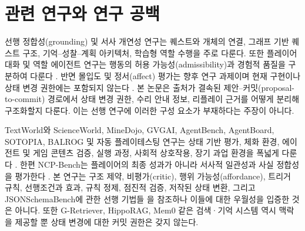 \documentclass[journal]{IEEEtran}
\begin{document}
\section{관련 연구와 연구 공백}
선행 정합성(grounding) 및 서사 개연성 연구는 퀘스트와 개체의 연결, 그래프 기반 퀘스트 구조, 기억--성찰--계획 아키텍처, 학습형 역할 수행을 주로 다룬다. 또한 플레이어 대화 및 역할 에이전트 연구는 행동의 허용 가능성(admissibility)과 경험적 품질을 구분하여 다룬다 \cite{S03_weir2024ontologically,S20_ashby2023personalized,S07_park2023generative,S08_shao2023character,S21_akoury2023player,S22_hochreiter2026beyond,S23_yin2026contextualized,S02_figueiredo2025scaffolded}. 반면 몰입도 및 정서(affect) 평가는 향후 연구 과제이며 현재 구현이나 상태 변경 권한에는 포함되지 않는다 \cite{S24_yannakakis2011experiencedriven,S25_melhart2020engagement,S26_wang2026engagement}. 본 논문은 출처가 결속된 제안--커밋(proposal-to-commit) 경로에서 상태 변경 권한, 수리 안내 정보, 리플레이 근거를 어떻게 분리해 구조화할지 다룬다. 이는 선행 연구에 이러한 구성 요소가 부재하다는 주장이 아니다.

TextWorld와 ScienceWorld, MineDojo, GVGAI, AgentBench, AgentBoard, SOTOPIA, BALROG 및 자동 플레이테스팅 연구는 상태 기반 평가, 체화 환경, 에이전트 및 게임 콘텐츠 검증, 실행 과정, 사회적 상호작용, 장기 과업 환경을 폭넓게 다룬다 \cite{S11_cote2019textworld,S12_wang2022scienceworld,S13_fan2022minedojo,S14_perezliebana2019gvgai,S15_liu2024agentbench,S16_ma2024agentboard,S17_zhou2024sotopia,S18_paglieri2025balrog,S19_lepelletier2022playtesting}. 한편 NCP-Bench는 플레이어의 최종 성과가 아니라 서사적 일관성과 사실 정합성을 평가한다 \cite{S58_ma2026ncpbench}. 본 연구는 구조 제약, 비평가(critic), 행위 가능성(affordance), 트리거 규칙, 선행조건과 효과, 규칙 정제, 점진적 검증, 저작된 상태 변환, 그리고 JSONSchemaBench에 관한 선행 기법들 \cite{S09_geng2023grammar,S10_beurerkellner2023prompting,S36_scholak2021picard,S50_kambhampati2024llmmodulo,S51_ichter2023saycan,S52_wang2025agentspec,S53_li2025settingdc,S54_zhou2025story2game,S42_buongiorno2024pangea,S01_vaucher2026ivie,S44_gongora2026worldstate,S57_geng2025jsonschemabench}을 참조하나 이들에 대한 우월성을 입증한 것은 아니다. 또한 G-Retriever, HippoRAG, Mem0 같은 검색·기억 시스템 \cite{S04_he2024gretriever,S05_gutierrez2024hipporag,S06_chhikara2025mem0} 역시 맥락을 제공할 뿐 상태 변경에 대한 커밋 권한은 갖지 않는다.
\end{document}
